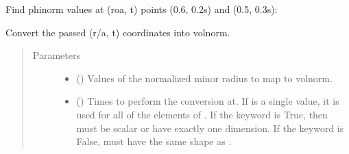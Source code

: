 \documentclass[letterpaper,10pt,english]{sphinxmanual}
\begin{document}
\begin{fulllineitems}
\begin{fulllineitems}
Find phinorm values at (roa, t) points (0.6, 0.2s) and (0.5, 0.3s):

\begin{sphinxVerbatim}[commandchars=\\\{\}]
  \PYG{p}{[} \PYG{p}{]} \PYG{p}{[} \PYG{p}{]} 
\end{sphinxVerbatim}

\end{fulllineitems}


\begin{fulllineitems}
\label{\detokenize{eqtools:eqtools.core.Equilibrium.roa2volnorm}}
Convert the passed (r/a, t) coordinates into volnorm.
\begin{quote}\begin{description}
\item[{Parameters}] \leavevmode\begin{itemize}
\item {} 
 () \textendash{} Values of the normalized minor
radius to map to volnorm.

\item {} 
 () \textendash{} Times to perform the conversion at.
If  is a single value, it is used for all of the elements of
. If the  keyword is True, then  must be scalar
or have exactly one dimension. If the  keyword is False,
 must have the same shape as .

\end{itemize}


\end{description}
\end{quote}
\end{fulllineitems}
\end{fulllineitems}
\end{document}
